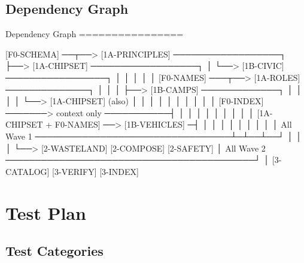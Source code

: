 \documentclass[11pt,letterpaper]{article}
\begin{document}
\subsection{Dependency Graph}

\begin{asciibox}
Dependency Graph
================

[F0-SCHEMA] ──┬──> [1A-PRINCIPLES] ──────────────────┐
              ├──> [1A-CHIPSET]  ──────────────────┐   │
              └──> [1B-CIVIC]  ─────────────────┐  │   │
                                                │  │   │
[F0-NAMES] ───┬──> [1A-ROLES]  ──────────────┐  │  │   │
              ├──> [1B-CAMPS]  ─────────────┐ │  │  │   │
              └──> [1A-CHIPSET] (also)      │ │  │  │   │
                                            │ │  │  │   │
[F0-INDEX] ───────> context only ───────────┤ │  │  │   │
                                            │ │  │  │   │
[1A-CHIPSET + F0-NAMES] ──> [1B-VEHICLES] ─┤ │  │  │   │
                                            │ │  │  │   │
All Wave 1 ─────────────────────────────────┴─┴──┴──┘   │
                                            │            │
                                            └──> [2-WASTELAND]
                                                 [2-COMPOSE]
                                                 [2-SAFETY]
                                                     │
All Wave 2 ──────────────────────────────────────────┘
                                                     │
                                            [3-CATALOG]
                                            [3-VERIFY]
                                            [3-INDEX]
\end{asciibox}

\section{Test Plan}

\subsection{Test Categories}
\end{document}
